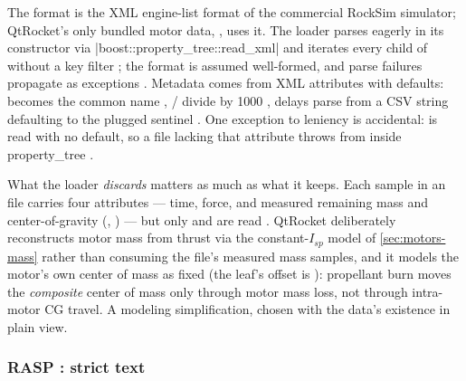 The  format is the XML engine-list format of the commercial RockSim simulator;
QtRocket's only bundled motor data, , uses it. The loader parses
eagerly in its constructor via \cppinline|boost::property_tree::read_xml|
 and iterates every child of
 without a key filter
; the format is assumed well-formed, and parse
failures propagate as exceptions . Metadata comes
from XML attributes with defaults:  becomes the common name
, / divide by 1000
, delays parse from a CSV string defaulting to the
plugged sentinel  . One exception
to leniency is accidental:  is read with no default, so a file lacking that
attribute throws from inside property\_tree .

What the loader \emph{discards} matters as much as what it keeps. Each
 sample in an  file carries four attributes --- time, force,
and measured remaining mass and center-of-gravity (, ) --- but only
 and  are read . QtRocket
deliberately reconstructs motor mass from thrust via the constant-$I_{sp}$ model of
\cref{sec:motors-mass} rather than consuming the file's measured mass samples, and it
models the motor's own center of mass as fixed (the  leaf's offset is
 ): propellant burn moves the
\emph{composite} center of mass only through motor mass loss, not through intra-motor CG
travel. A modeling simplification, chosen with the data's existence in plain view.

\subsubsection{RASP : strict text}\label{sec:motors-ingest-rasp}

